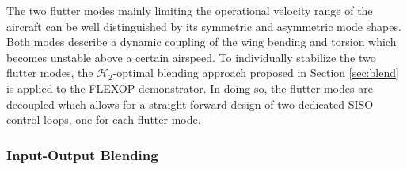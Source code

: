 \documentclass[aerospace,article,submit,moreauthors,pdftex,10pt,a4paper]{Definitions/mdpi}
\begin{document}
The two flutter modes mainly limiting the operational velocity range of the aircraft can be well distinguished by its symmetric and asymmetric mode shapes. Both modes describe a dynamic coupling of the wing bending and torsion which becomes unstable above a certain airspeed.
To individually stabilize the two flutter modes, the $\mathcal{H}_2$-optimal blending approach proposed in Section \ref{sec:blend} is applied to the FLEXOP demonstrator. In doing so, the flutter modes are decoupled which allows for a straight forward design of two dedicated SISO control loops, one for each flutter mode. 


\subsubsection{Input-Output Blending}
\end{document}
